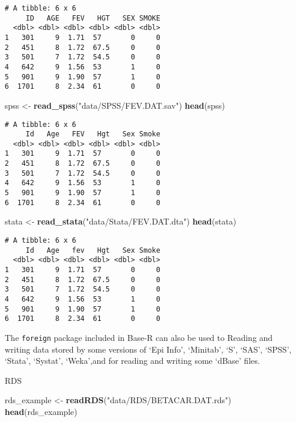 \documentclass[12pt,]{article}
\newenvironment{Shaded}{\begin{snugshade}}{\end{snugshade}}
\newcommand{\KeywordTok}[1]{\textcolor[rgb]{0.13,0.29,0.53}{\textbf{#1}}}
\newcommand{\NormalTok}[1]{#1}
\newcommand{\StringTok}[1]{\textcolor[rgb]{0.31,0.60,0.02}{#1}}
\begin{document}
\begin{verbatim}
# A tibble: 6 x 6
     ID   AGE   FEV   HGT   SEX SMOKE
  <dbl> <dbl> <dbl> <dbl> <dbl> <dbl>
1   301     9  1.71  57       0     0
2   451     8  1.72  67.5     0     0
3   501     7  1.72  54.5     0     0
4   642     9  1.56  53       1     0
5   901     9  1.90  57       1     0
6  1701     8  2.34  61       0     0
\end{verbatim}

\begin{Shaded}
\begin{Highlighting}[]
\NormalTok{spss <-}\StringTok{ }\KeywordTok{read_spss}\NormalTok{(}\StringTok{"data/SPSS/FEV.DAT.sav"}\NormalTok{)}
\KeywordTok{head}\NormalTok{(spss)}
\end{Highlighting}
\end{Shaded}

\begin{verbatim}
# A tibble: 6 x 6
     Id   Age   FEV   Hgt   Sex Smoke
  <dbl> <dbl> <dbl> <dbl> <dbl> <dbl>
1   301     9  1.71  57       0     0
2   451     8  1.72  67.5     0     0
3   501     7  1.72  54.5     0     0
4   642     9  1.56  53       1     0
5   901     9  1.90  57       1     0
6  1701     8  2.34  61       0     0
\end{verbatim}

\begin{Shaded}
\begin{Highlighting}[]
\NormalTok{stata <-}\StringTok{ }\KeywordTok{read_stata}\NormalTok{(}\StringTok{"data/Stata/FEV.DAT.dta"}\NormalTok{)}
\KeywordTok{head}\NormalTok{(stata)}
\end{Highlighting}
\end{Shaded}

\begin{verbatim}
# A tibble: 6 x 6
     Id   Age   fev   Hgt   Sex Smoke
  <dbl> <dbl> <dbl> <dbl> <dbl> <dbl>
1   301     9  1.71  57       0     0
2   451     8  1.72  67.5     0     0
3   501     7  1.72  54.5     0     0
4   642     9  1.56  53       1     0
5   901     9  1.90  57       1     0
6  1701     8  2.34  61       0     0
\end{verbatim}

The \texttt{foreign} package included in Base-R can also be used to
Reading and writing data stored by some versions of `Epi Info',
`Minitab', `S', `SAS', `SPSS', `Stata', `Systat', `Weka',and for reading
and writing some `dBase' files.

RDS

\begin{Shaded}
\begin{Highlighting}[]
\NormalTok{rds_example <-}\StringTok{ }\KeywordTok{readRDS}\NormalTok{(}\StringTok{"data/RDS/BETACAR.DAT.rds"}\NormalTok{)}
\KeywordTok{head}\NormalTok{(rds_example)}
\end{Highlighting}
\end{Shaded}
\end{document}
